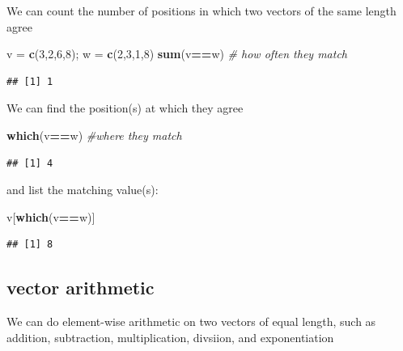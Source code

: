 \documentclass[
]{book}
\newenvironment{Shaded}{\begin{snugshade}}{\end{snugshade}}
\newcommand{\CommentTok}[1]{\textcolor[rgb]{0.56,0.35,0.01}{\textit{#1}}}
\newcommand{\DecValTok}[1]{\textcolor[rgb]{0.00,0.00,0.81}{#1}}
\newcommand{\FunctionTok}[1]{\textcolor[rgb]{0.13,0.29,0.53}{\textbf{#1}}}
\newcommand{\NormalTok}[1]{#1}
\newcommand{\OtherTok}[1]{\textcolor[rgb]{0.56,0.35,0.01}{#1}}
\newcommand{\SpecialCharTok}[1]{\textcolor[rgb]{0.81,0.36,0.00}{\textbf{#1}}}
\theoremstyle{definition}
\theoremstyle{definition}
\theoremstyle{definition}
\theoremstyle{definition}
\theoremstyle{remark}
\begin{document}
We can count the number of positions in which two vectors of the same length agree

\begin{Shaded}
\begin{Highlighting}[]
\NormalTok{v }\OtherTok{=} \FunctionTok{c}\NormalTok{(}\DecValTok{3}\NormalTok{,}\DecValTok{2}\NormalTok{,}\DecValTok{6}\NormalTok{,}\DecValTok{8}\NormalTok{); w }\OtherTok{=} \FunctionTok{c}\NormalTok{(}\DecValTok{2}\NormalTok{,}\DecValTok{3}\NormalTok{,}\DecValTok{1}\NormalTok{,}\DecValTok{8}\NormalTok{)}
\FunctionTok{sum}\NormalTok{(v}\SpecialCharTok{==}\NormalTok{w) }\CommentTok{\# how often they match}
\end{Highlighting}
\end{Shaded}

\begin{verbatim}
## [1] 1
\end{verbatim}

We can find the position(s) at which they agree

\begin{Shaded}
\begin{Highlighting}[]
\FunctionTok{which}\NormalTok{(v}\SpecialCharTok{==}\NormalTok{w) }\CommentTok{\#where they match}
\end{Highlighting}
\end{Shaded}

\begin{verbatim}
## [1] 4
\end{verbatim}

and list the matching value(s):

\begin{Shaded}
\begin{Highlighting}[]
\NormalTok{v[}\FunctionTok{which}\NormalTok{(v}\SpecialCharTok{==}\NormalTok{w)] }
\end{Highlighting}
\end{Shaded}

\begin{verbatim}
## [1] 8
\end{verbatim}

\subsection*{vector arithmetic}\label{vector-arithmetic}

We can do element-wise arithmetic on two vectors of equal length, such as addition, subtraction, multiplication, divsiion, and exponentiation
\end{document}
